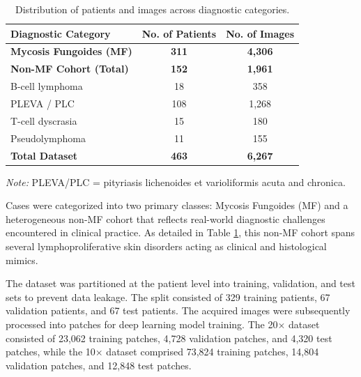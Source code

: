 \documentclass[conference]{IEEEtran}
\begin{document}
\begin{table}[htbp]
    \centering
    \caption{Distribution of patients and images across diagnostic categories.}
    \label{tab:dataset_distribution}
    \begin{tabular}{@{}lcc@{}}
        \toprule
        \textbf{Diagnostic Category} & \textbf{No. of Patients} & \textbf{No. of Images} \\        \midrule
        \textbf{Mycosis Fungoides (MF)} & \textbf{311} & \textbf{4,306} \\
        \midrule
        \textbf{Non-MF Cohort (Total)} & \textbf{152} & \textbf{1,961} \\
        \hspace{4mm} B-cell lymphoma & 18 & 358 \\
        \hspace{4mm} PLEVA / PLC & 108 & 1,268 \\
        \hspace{4mm} T-cell dyscrasia & 15 & 180 \\
        \hspace{4mm} Pseudolymphoma & 11 & 155 \\
        \midrule
        \textbf{Total Dataset} & \textbf{463} & \textbf{6,267} \\
        \bottomrule
    \end{tabular}
    
    \vspace{1ex}
    {\raggedright \footnotesize \textit{Note:} PLEVA/PLC = pityriasis lichenoides et varioliformis acuta and chronica.\par}
\end{table}
Cases were categorized into two primary classes: Mycosis Fungoides (MF) and a heterogeneous non-MF 
cohort that reflects real-world diagnostic challenges encountered in clinical practice. 
As detailed in Table \ref{tab:dataset_distribution}, this non-MF cohort spans several 
lymphoproliferative skin disorders acting as clinical and histological mimics.

The dataset was partitioned at the patient level into training, validation, and 
test sets to prevent data leakage. The split consisted of 329 training patients, 67 validation patients, and 67 test patients. 
The acquired images were subsequently processed into patches for deep learning model training. 
The 20$\times$ dataset consisted of 23,062 training patches, 4,728 validation patches, and 4,320 test patches, 
while the 10$\times$ dataset comprised 73,824 training patches, 14,804 validation patches, and 12,848 test patches.
\end{document}
